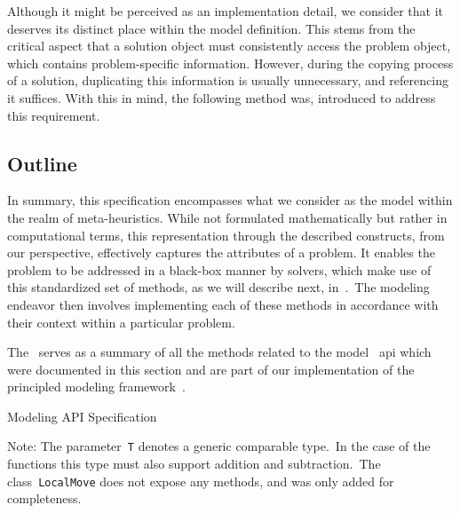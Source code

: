 Although it might be perceived as an implementation detail, we consider that it
deserves its distinct place within the model definition. This stems from the
critical aspect that a solution object must consistently access the problem
object, which contains problem-specific information. However, during the copying
process of a solution, duplicating this information is usually unnecessary, and
referencing it suffices. With this in mind, the following method was, introduced
to address this requirement.

\begin{center}
\end{center}

\subsection{Outline}

In summary, this specification encompasses what we consider as the model within
the realm of meta-heuristics. While not formulated mathematically but rather in
computational terms, this representation through the described constructs, from
our perspective, effectively captures the attributes of a problem. It enables
the problem to be addressed in a black-box manner by solvers, which make use of
this standardized set of methods, as we will describe next,
in~.~The modeling endeavor then involves implementing each of
these methods in accordance with their context within a particular problem.

The~ serves as a summary of all the methods related to the model
~\acrshort{api} which were documented in this section and are part of our
implementation of the principled modeling framework~\cite{rodriguesnasf4niopy}.

\begin{table}[h]
  \centering
  
  \caption{Modeling API Specification}
  \caption*{\small Note: The parameter~\texttt{T} denotes a generic comparable
    type.~In the case of the  functions this type must also support
    addition and subtraction.~The class~\texttt{LocalMove} does not expose any methods,
    and was only added for completeness.
  }
  \label{tab:api}
\end{table}